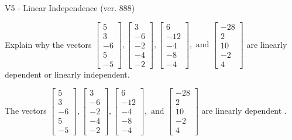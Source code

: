 \begin{exercise}
  \begin{exerciseTitle}V5 - Linear Independence (ver. 888)\end{exerciseTitle}
  \begin{exerciseStatement}
    Explain why the vectors \(\left[\begin{array}{r}
5 \\
3 \\
-6 \\
5 \\
-5
\end{array}\right] , \left[\begin{array}{r}
3 \\
-6 \\
-2 \\
-4 \\
-2
\end{array}\right] , \left[\begin{array}{r}
6 \\
-12 \\
-4 \\
-8 \\
-4
\end{array}\right] , \text{ and } \left[\begin{array}{r}
-28 \\
2 \\
10 \\
-2 \\
4
\end{array}\right]\) are linearly dependent or linearly independent.	


  \end{exerciseStatement}
  \begin{exerciseAnswer}
   The vectors \(\left[\begin{array}{r}
5 \\
3 \\
-6 \\
5 \\
-5
\end{array}\right] , \left[\begin{array}{r}
3 \\
-6 \\
-2 \\
-4 \\
-2
\end{array}\right] , \left[\begin{array}{r}
6 \\
-12 \\
-4 \\
-8 \\
-4
\end{array}\right] , \text{ and } \left[\begin{array}{r}
-28 \\
2 \\
10 \\
-2 \\
4
\end{array}\right]\) are 
  	 linearly dependent  .
  


  \end{exerciseAnswer}
\end{exercise}